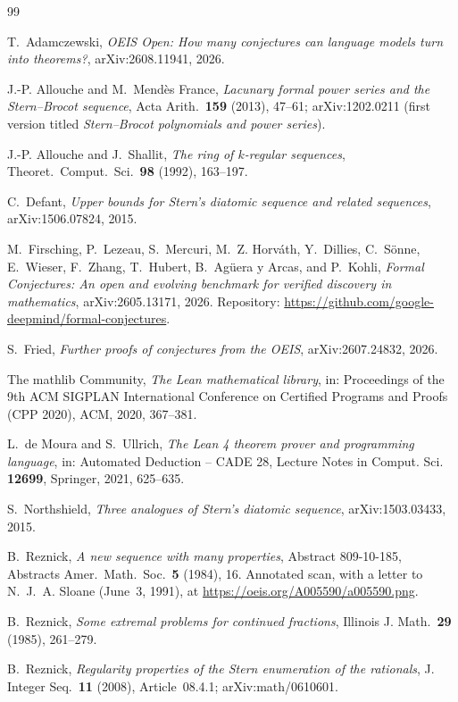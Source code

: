 \documentclass[11pt]{amsart}
\theoremstyle{plain}
\theoremstyle{definition}
\begin{document}
{\small
\begin{thebibliography}{99}

T.~Adamczewski, \emph{OEIS Open: How many conjectures can language models turn into theorems?}, arXiv:2608.11941, 2026.

J.-P. Allouche and M.~Mend\`es France, \emph{Lacunary formal power series and the Stern--Brocot sequence}, Acta Arith.\ \textbf{159} (2013), 47--61; arXiv:1202.0211 (first version titled \emph{Stern--Brocot polynomials and power series}).

J.-P. Allouche and J.~Shallit, \emph{The ring of $k$-regular sequences}, Theoret.\ Comput.\ Sci.\ \textbf{98} (1992), 163--197.

C.~Defant, \emph{Upper bounds for Stern's diatomic sequence and related sequences}, arXiv:1506.07824, 2015.

M.~Firsching, P.~Lezeau, S.~Mercuri, M.~Z. Horv\'ath, Y.~Dillies, C.~S\"onne, E.~Wieser, F.~Zhang, T.~Hubert, B.~Ag\"uera y Arcas, and P.~Kohli, \emph{Formal Conjectures: An open and evolving benchmark for verified discovery in mathematics}, arXiv:2605.13171, 2026. Repository: \url{https://github.com/google-deepmind/formal-conjectures}.

S.~Fried, \emph{Further proofs of conjectures from the OEIS}, arXiv:2607.24832, 2026.

The mathlib Community, \emph{The Lean mathematical library}, in: Proceedings of the 9th ACM SIGPLAN International Conference on Certified Programs and Proofs (CPP 2020), ACM, 2020, 367--381.

L.~de Moura and S.~Ullrich, \emph{The Lean 4 theorem prover and programming language}, in: Automated Deduction -- CADE 28, Lecture Notes in Comput. Sci. \textbf{12699}, Springer, 2021, 625--635.

S.~Northshield, \emph{Three analogues of Stern's diatomic sequence}, arXiv:1503.03433, 2015.

B.~Reznick, \emph{A new sequence with many properties}, Abstract 809-10-185, Abstracts Amer.\ Math.\ Soc.\ \textbf{5} (1984), 16. Annotated scan, with a letter to N.~J.~A. Sloane (June~3, 1991), at \url{https://oeis.org/A005590/a005590.png}.

B.~Reznick, \emph{Some extremal problems for continued fractions}, Illinois J. Math.\ \textbf{29} (1985), 261--279.

B.~Reznick, \emph{Regularity properties of the Stern enumeration of the rationals}, J. Integer Seq.\ \textbf{11} (2008), Article~08.4.1; arXiv:math/0610601.


\end{thebibliography}}
\end{document}
